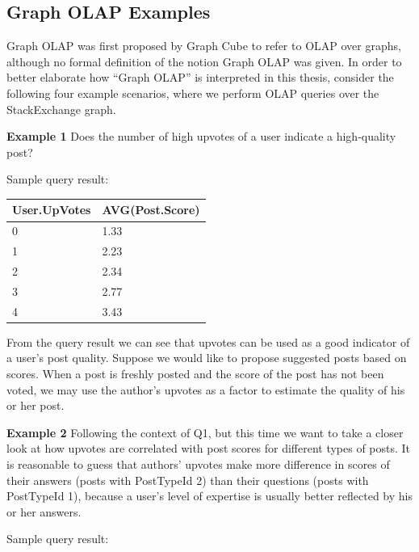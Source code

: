 \subsection{Graph OLAP Examples}
\label{OLAPExamples}
Graph OLAP was first proposed by Graph Cube \cite{sigmod11_ZhaoLXH11} to refer to OLAP over graphs, although no formal definition of the notion Graph OLAP was given. In order to better elaborate how ``Graph OLAP'' is interpreted in this thesis, consider the following four example scenarios, where we perform OLAP queries over the StackExchange graph.

\noindent\textbf{Example 1} Does the number of high upvotes of a user indicate a high-quality post?


Sample query result:
\begin {center}
\begin{tabular}{ l l }
	User.UpVotes&AVG(Post.Score)\\\hline
	0&1.33\\
	1&2.23\\
	2&2.34\\
	3&2.77\\
	4&3.43\\\hline
\end{tabular}
\end {center}

From the query result we can see that upvotes can be used as a good indicator of a user's post quality. Suppose we would like to propose suggested posts based on scores. When a post is freshly posted and the score of the post has not been voted, we may use the author’s upvotes as a factor to estimate the quality of his or her post.

\noindent\textbf{Example 2} Following the context of Q1, but this time we want to take a closer look at how  upvotes are correlated with post scores for different types of posts. It is reasonable to guess that authors' upvotes make more difference in scores of their answers (posts with PostTypeId 2) than their questions (posts with PostTypeId 1), because a user's level of expertise is usually better reflected by his or her answers.


Sample query result:

